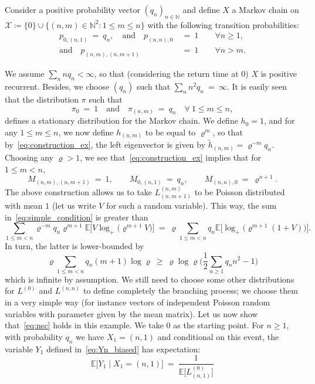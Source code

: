 \begin{refsegment}
Consider a positive probability vector $(q_n)_{n\in \mathbb{N}}$ and define $X$ a Markov chain on $\mathcal{X}\coloneqq\{0\}\cup \{(n,m)\in \mathbb{N}^2 : 1\leq m \leq n\}$ with the following transition probabilities:
\begin{align*}
  p_{0,(n,1)}\ =\ q_n, \quad \text{and}\quad  p_{(n,n),0} &\ =\ 1 \qquad \forall n\geq 1,\\
  \text{and}\quad p_{(n,m),(n,m+1)} &\ =\ 1 \qquad  \forall n > m.
\end{align*}

We assume $\sum_n nq_n<\infty$, so that (considering the return time at $0$) $X$ is positive recurrent. Besides, we choose $(q_n)$ such that $\sum_{n} n^2q_n\ =\ \infty.$
It is easily seen that the  distribution $\pi$ such that
\[
 \pi_0\ =\ 1\quad\text{and}\quad  \pi_{(n,m)}\ =\ q_n \quad  \forall\ 1\leq  m\leq n,
\]
 defines a stationary distribution for the Markov chain.
We define $h_0 = 1$, and for any $1\leq m\leq n$, we now define $h_{(n,m)}$   to be equal to $\varrho^m$, so that by~\eqref{eq:construction_ex}, the left eigenvector is given by  $\tilde{h}_{(n,m)}=\varrho^{-m}q_n$.
Choosing any $\varrho>1$, we see that~\eqref{eq:construction_ex} implies that for $1\leq m < n$,
\[M_{(n,m),(n,m+1)}\ =\ 1,\qquad M_{0,(n,1)}\ =\  q_n,\qquad M_{(n,n),0}\ =\ \varrho^{n+1}.
\]
The above construction allows us to take $L^{(n,m)}_{(n,m+1)}$ to be Poisson distributed with mean $1$ (let us write $V$ for such a random variable).
This way, the sum in~\eqref{eq:simple_condition} is greater than
\[
 \sum_{1\leq m < n}  \varrho^{-m} q_n \varrho^{m+1} \mathbb{E}\Big[V\log_+ \big(\varrho^{m+1}V\big)\Big]\ =\  \varrho \sum_{1\leq m < n} q_n \mathbb{E}\Big[\log_+\big(\varrho^{m+1}(1+ V)\big)\Big].
\]
In turn, the latter is lower-bounded by 
\[
  \varrho \sum_{1\leq m < n} q_n (m+1) \log \varrho \ \geq \ \varrho\log \varrho \Big(\frac{1}{2} \sum_{n\geq 1} q_n n^2 - 1\Big)
\]
which is infinite by assumption. We still need to choose some other
distributions for $L^{(0)}$ and $L^{(n,n)}$ to define completely the
branching process; we choose them in a very simple way (for instance
vectors of independent Poisson random variables with parameter given
by the mean matrix). Let us now show that~\eqref{eq:nsc} holds
  in this example. We take $0$ as the starting point. For $n\geq 1$,
  with probability $q_n$ we have $X_1=(n,1)$ and conditional on this
  event, the variable $Y_1$ defined in~\eqref{eq:Yn_biased} has
  expectation:
  \[
    \mathbb{E}\big[ Y_1 \mid X_1 = (n,1) \big]\ =\
    \frac{1}{\mathbb{E}\big[L^{(0)}_{(n,1)}\big]}
\]
\end{refsegment}
